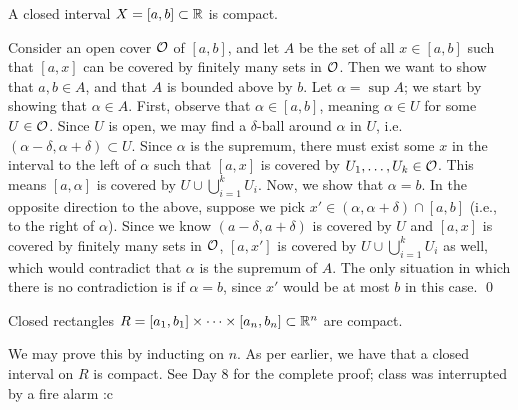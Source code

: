 \begin{simplethm}
    A closed interval $X = [a, b] \subset \mathbb R$ is compact.
\end{simplethm}
\noindent Consider an open cover $\mathcal O$ of $[a, b]$, and let $A$ be the set of all $x \in [a, b]$ such that $[a, x]$ can be covered by finitely many sets in $\mathcal O$. Then we want to show that $a, b \in A$, and that $A$ is bounded above by $b$.
\medskip\newline
\noindent Let $\alpha = \sup A$; we start by showing that $\alpha \in A$. First, observe that $\alpha \in [a, b]$, meaning $\alpha \in U$ for some $U \in \mathcal O$. Since $U$ is open, we may find a $\delta$-ball around $\alpha$ in $U$, i.e. $(\alpha - \delta, \alpha + \delta) \subset U$. Since $\alpha$ is the supremum, there must exist some $x$ in the interval to the left of $\alpha$ such that $[a, x]$ is covered by $U_1, \dots, U_k \in \mathcal O$. This means $[a, \alpha]$ is covered by $U \cup \bigcup_{i=1}^k U_i$.
\medskip\newline
\noindent Now, we show that $\alpha = b$. In the opposite direction to the above, suppose we pick $x' \in (\alpha, \alpha + \delta) \cap [a, b]$ (i.e., to the right of $\alpha$). Since we know $(a - \delta, a + \delta)$ is covered by $U$ and $[a, x]$ is covered by finitely many sets in $\mathcal O$, $[a, x']$ is covered by $U \cup \bigcup_{i=1}^k U_i$ as well, which would contradict that $\alpha$ is the supremum of $A$. The only situation in which there is no contradiction is if $\alpha = b$, since $x'$ would be at most $b$ in this case. \qed

\begin{simplelemma}
    Closed rectangles $R = [a_1, b_1] \times \dots \times [a_n, b_n] \subset \mathbb R^n$ are compact.
\end{simplelemma}
\noindent We may prove this by inducting on $n$. As per earlier, we have that a closed interval on $R$ is compact. See Day 8 for the complete proof; class was interrupted by a fire alarm :c
